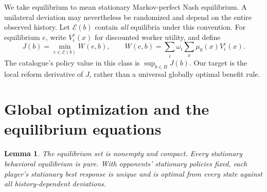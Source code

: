 \documentclass[11pt]{article}
\newtheorem{lemma}{Lemma}
\begin{document}
We take equilibrium to mean stationary Markov-perfect Nash equilibrium. A unilateral deviation may nevertheless be randomized and depend on the entire observed history. Let $\mathcal E(b)$ contain \emph{all} equilibria under this convention. For equilibrium $e$, write $V_i^e(x)$ for discounted worker utility, and define
\begin{equation}\label{eq:objective}
 J(b)=\min_{e\in\mathcal E(b)}W(e,b),\qquad
 W(e,b)=\sum_i\omega_i\sum_x\mu_0(x)V_i^e(x).
\end{equation}
The catalogue's policy value in this class is $\sup_{b\in B}J(b)$. Our target is the local reform derivative of $J$, rather than a universal globally optimal benefit rule.

\section{Global optimization and the equilibrium equations}
\begin{lemma}\label{lem:equilibrium}
The equilibrium set is nonempty and compact. Every stationary behavioral equilibrium is pure. With opponents' stationary policies fixed, each player's stationary best response is unique and is optimal from every state against all history-dependent deviations.
\end{lemma}
\end{document}
